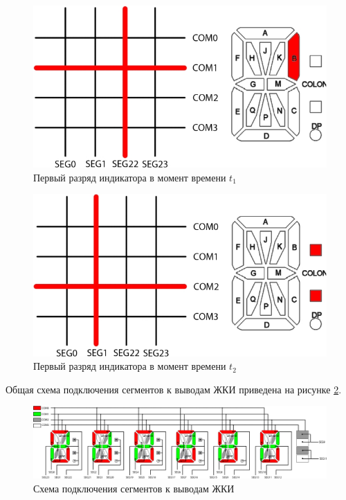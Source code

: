 \begin{figure}[H]
\begin{center}
\includegraphics[scale=0.4]{Image/33.jpg} 
\end{center}
\caption{Первый разряд индикатора в момент времени $t_1$}
\end{figure}


\begin{figure}[H]
\begin{center}
\includegraphics[scale=0.4]{Image/34.jpg} 
\end{center}
\caption{Первый разряд индикатора в момент времени $t_2$}\label{t31}
\end{figure}

Общая схема подключения сегментов к выводам ЖКИ приведена на рисунке \ref{shema}.


\begin{figure}[H]
\begin{center}
\includegraphics[scale=0.33]{Image/35.jpg} 
\end{center}
\caption{Схема подключения сегментов к выводам ЖКИ}\label{shema}
\end{figure}

